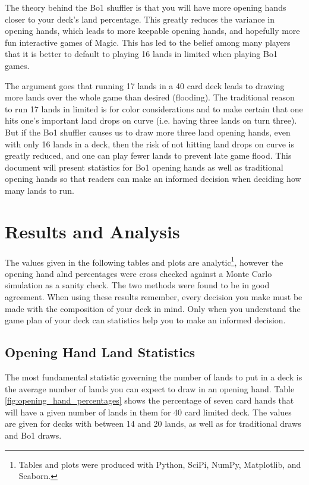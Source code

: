 \documentclass[oneside]{book}   %
\begin{document}
The theory behind the Bo1 shuffler is that you will have more opening hands closer to your deck's land percentage. This greatly reduces the variance in opening hands, which leads to more keepable opening hands, and hopefully more fun interactive games of Magic. This has led to the belief among many players that it is better to default to playing 16 lands in limited when playing Bo1 games. 

The argument goes that running 17 lands in a 40 card deck leads to drawing more lands over the whole game than desired (flooding). The traditional reason to run 17 lands in limited is for color considerations and to make certain that one hits one's important land drops on curve (i.e. having three lands on turn three). But if the Bo1 shuffler causes us to draw more three land opening hands, even with only 16 lands in a deck, then the risk of not hitting land drops on curve is greatly reduced, and one can play fewer lands to prevent late game flood. This document will present statistics for Bo1 opening hands as well as traditional opening hands so that readers can make an informed decision when deciding how many lands to run.

\chapter{Results and Analysis}
\label{results}

The values given in the following tables and plots are analytic\footnote{Tables and plots were produced with Python, SciPi, NumPy, Matplotlib, and Seaborn.}, however the opening hand alnd percentages were cross checked against a Monte Carlo simulation as a sanity check. The two methods were found to be in good agreement. When using these results remember, every decision you make must be made with the composition of your deck in mind. Only when you understand the game plan of your deck can statistics help you to make an informed decision.

\section{Opening Hand Land Statistics}
\label{opener}

The most fundamental statistic governing the number of lands to put in a deck is the average number of lands you can expect to draw in an opening hand. Table \ref{fig:opening_hand_percentages} shows the percentage of seven card hands that will have a given number of lands in them for 40 card limited deck. The values are given for decks with between 14 and 20 lands, as well as for traditional draws and Bo1 draws.  
\end{document}
